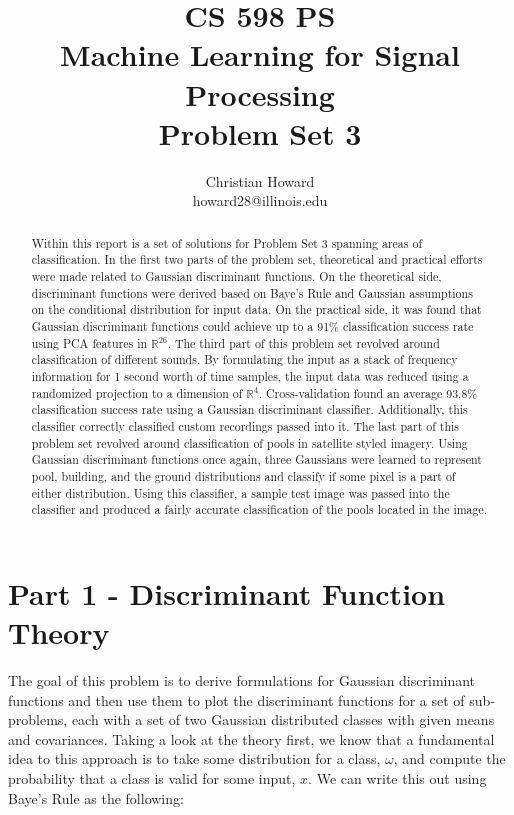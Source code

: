\documentclass{article}[12pt]
\title{CS 598 PS \\ Machine Learning for Signal Processing \\ Problem Set 3}
\author{
Christian Howard \\ howard28@illinois.edu
}
\date{} %
\begin{document}
   
   \maketitle
   \begin{abstract}
   	Within this report is a set of solutions for Problem Set 3 spanning areas of classification. In the first two parts of the problem set, theoretical and practical efforts were made related to Gaussian discriminant functions. On the theoretical side, discriminant functions were derived based on Baye's Rule and Gaussian assumptions on the conditional distribution for input data. On the practical side, it was found that Gaussian discriminant functions could achieve up to a 91\% classification success rate using PCA features in $\mathbb{R}^{26}$. The third part of this problem set revolved around classification of different sounds. By formulating the input as a stack of frequency information for 1 second worth of time samples, the input data was reduced using a randomized projection to a dimension of $\mathbb{R}^4$. Cross-validation found an average 93.8\% classification success rate using a Gaussian discriminant classifier. Additionally, this classifier correctly classified custom recordings passed into it. The last part of this problem set revolved around classification of pools in satellite styled imagery. Using Gaussian discriminant functions once again, three Gaussians were learned to represent pool, building, and the ground distributions and classify if some pixel is a part of either distribution. Using this classifier, a sample test image was passed into the classifier and produced a fairly accurate classification of the pools located in the image.
   \end{abstract}
   \newpage
   
   \tableofcontents
   
   
   \newpage
   \section{Part 1 - Discriminant Function Theory}
   The goal of this problem is to derive formulations for Gaussian discriminant functions and then use them to plot the discriminant functions for a set of sub-problems, each with a set of two Gaussian distributed classes with given means and covariances. Taking a look at the theory first, we know that a fundamental idea to this approach is to take some distribution for a class, $\omega$, and compute the probability that a class is valid for some input, $x$. We can write this out using Baye's Rule as the following:
   
\end{document}
